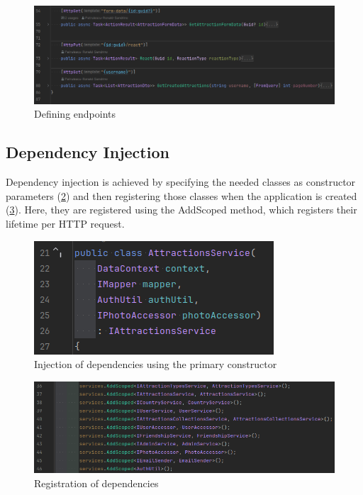 \begin{figure}[!ht]
    \centering
    \includegraphics[width=1\linewidth]{4.3.4_url-mapping-endpoints.png}
    \caption{Defining endpoints}
    \label{fig:url-mapping-endpoints}
\end{figure}

\subsection{Dependency Injection}

\par Dependency injection is achieved by specifying the needed classes as constructor parameters (\ref{fig:dependency-injection_usage}) and then registering those classes when the application is created (\ref{fig:dependency-injection_registering}). Here, they are registered using the AddScoped method, which registers their lifetime per HTTP request.


\begin{figure}[!ht]
    \centering
    \includegraphics[width=0.5\linewidth]{dependency-injection_usage.png}
    \caption{Injection of dependencies using the primary constructor}
    \label{fig:dependency-injection_usage}
\end{figure}

\begin{figure}
    \centering
    \includegraphics[width=1\linewidth]{dependency-injection_registering.png}
    \caption{Registration of dependencies}
    \label{fig:dependency-injection_registering}
\end{figure}

